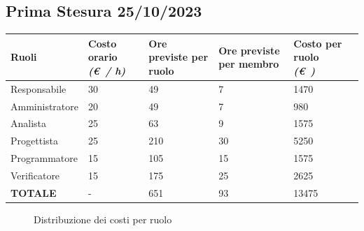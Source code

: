 \documentclass{article}
\begin{document}
\subsection{Prima Stesura 25/10/2023}
\begin{center}
        
    \begin{tabular}{|C{3cm}|C{2cm}|C{2cm}|C{2cm}|C{2cm}|C{2cm}|}
        \hline

        \textbf{Ruoli} & \textbf{Costo orario} \linebreak \textit{(\euro\ / h)} & \textbf{Ore previste per ruolo} & \textbf{Ore previste per membro} & \textbf{Costo per ruolo} \linebreak \textit{(\euro\ )} \\
        \hline\hline
        
        Responsabile & 30 & 49 & 7 & 1470 \\
        \hline
        
        Amministratore & 20 & 49 & 7 & 980 \\
        \hline
        
        Analista & 25 & 63 & 9 & 1575 \\
        \hline 
        
        Progettista & 25 & 210 & 30 & 5250 \\ 
        \hline
        
        Programmatore & 15 & 105 & 15 & 1575 \\
        \hline
        
        Verificatore & 15 & 175 & 25 & 2625 \\
        \hline\hline
        
        \textbf{TOTALE} & - & 651 & 93 & 13475 \\
        \hline
    \end{tabular}
    \end{center}

    \begin{figure}[h]
        \centering
        \caption{Distribuzione dei costi per ruolo}
    \end{figure}
    
\end{document}
